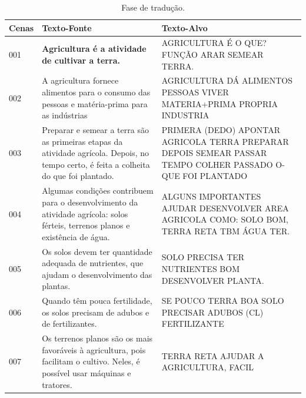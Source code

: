 \documentclass[portuguese]{textolivre}
\begin{document}
\begin{footnotesize}
\renewcommand{\arraystretch}{1.5}
\begin{longtable}{
l 
    >{\raggedright\arraybackslash}p{}
    >{\raggedright\arraybackslash}p{}
    }
\caption{Fase de tradução.}
\label{tab02}
\\
\toprule
Cenas & Texto-Fonte & Texto-Alvo  \\
 \midrule
001 & \textbf{Agricultura é a atividade de cultivar a terra.} & AGRICULTURA É O QUE? FUNÇÃO ARAR SEMEAR TERRA. \\
002 & A agricultura fornece alimentos para o consumo das pessoas e matéria-prima para as indústrias &
AGRICULTURA DÁ ALIMENTOS PESSOAS VIVER MATERIA+PRIMA PROPRIA INDUSTRIA \\
003 & Preparar e semear a terra são as primeiras etapas da atividade agrícola. Depois, no tempo certo, é feita a colheita do que foi plantado. & PRIMERA (DEDO) APONTAR AGRICOLA TERRA PREPARAR DEPOIS SEMEAR PASSAR TEMPO COLHER PASSADO O-QUE FOI PLANTADO \\
004 & Algumas condições contribuem para o desenvolvimento da atividade agrícola: solos férteis, terrenos planos e existência de água. & ALGUNS IMPORTANTES AJUDAR DESENVOLVER AREA AGRICOLA COMO: SOLO BOM, TERRA RETA TBM ÁGUA TER. \\
005 & Os solos devem ter quantidade adequada de nutrientes, que ajudam o desenvolvimento das plantas. &
SOLO PRECISA TER NUTRIENTES BOM DESENVOLVER PLANTA. \\
006 & Quando têm pouca fertilidade, os solos precisam de adubos e de fertilizantes. & SE POUCO TERRA BOA SOLO PRECISAR ADUBOS (CL) FERTILIZANTE \\
007 & Os terrenos planos são os mais favoráveis à agricultura, pois facilitam o cultivo. Neles, é possível usar máquinas e tratores. & TERRA RETA AJUDAR A AGRICULTURA, FACIL 


\end{longtable}
\end{footnotesize}
\end{document}
